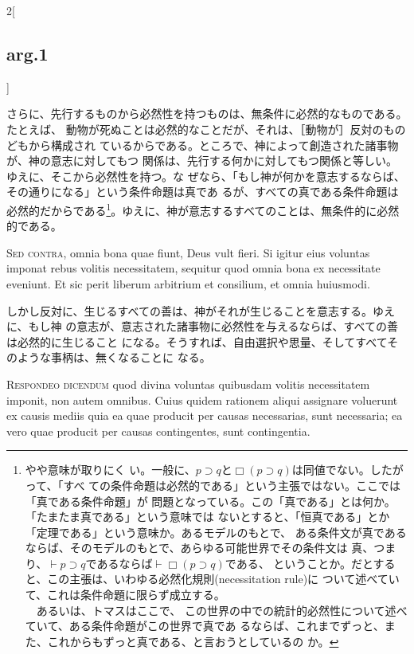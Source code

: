 \documentclass[paper=a4paper,fontsize=10pt,jafontsize=9pt,titlepage]{jlreq}
\begin{document}
\begin{paracol}{2}[\subsection{arg.1}]
\switchcolumn

さらに、先行するものから必然性を持つものは、無条件に必然的なものである。たとえば、
 動物が死ぬことは必然的なことだが、それは、［動物が］反対のものどもから構成され
 ているからである。ところで、神によって創造された諸事物が、神の意志に対してもつ
 関係は、先行する何かに対してもつ関係と等しい。ゆえに、そこから必然性を持つ。な
 ぜなら、「もし神が何かを意志するならば、その通りになる」という条件命題は真であ
 るが、すべての真である条件命題は必然的だからである\footnote{やや意味が取りにく
 い。一般に、$p \supset q$と$\Box(p \supset q)$は同値でない。したがって、「すべ
 ての条件命題は必然的である」という主張ではない。ここでは「真である条件命題」が
 問題となっている。この「真である」とは何か。「たまたま真である」という意味では
 ないとすると、「恒真である」とか「定理である」という意味か。あるモデルのもとで、
 ある条件文が真であるならば、そのモデルのもとで、あらゆる可能世界でその条件文は
 真、つまり、$\vdash p \supset q$であるならば$\vdash \Box(p \supset q)$である、
 ということか。だとすると、この主張は、いわゆる必然化規則(necessitation rule)に
 ついて述べていて、これは条件命題に限らず成立する。\\　あるいは、トマスはここで、
 この世界の中での統計的必然性について述べていて、ある条件命題がこの世界で真であ
 るならば、これまでずっと、また、これからもずっと真である、と言おうとしているの
 か。}。ゆえに、神が意志するすべてのことは、無条件的に必然的である。

\switchcolumn*[\subsection{s.c.}]


{\scshape Sed contra}, omnia bona quae fiunt, Deus vult
fieri. Si igitur eius voluntas imponat rebus volitis necessitatem,
sequitur quod omnia bona ex necessitate eveniunt. Et sic perit liberum
arbitrium et consilium, et omnia huiusmodi.

\switchcolumn

しかし反対に、生じるすべての善は、神がそれが生じることを意志する。ゆえに、もし神
の意志が、意志された諸事物に必然性を与えるならば、すべての善は必然的に生じること
になる。そうすれば、自由選択や思量、そしてすべてそのような事柄は、無くなることに
なる。



{\scshape Respondeo dicendum} quod divina voluntas quibusdam volitis
necessitatem imponit, non autem omnibus. Cuius quidem rationem aliqui assignare
voluerunt ex causis mediis quia ea quae producit per causas necessarias, sunt
necessaria; ea vero quae producit per causas contingentes, sunt contingentia.


\end{paracol}
\end{document}
